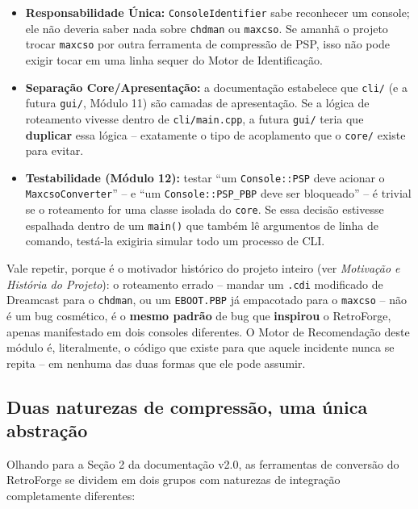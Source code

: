 \begin{itemize}
    \item \textbf{Responsabilidade Única:} \texttt{ConsoleIdentifier} sabe reconhecer um console;
ele não deveria saber nada sobre \texttt{chdman} ou \texttt{maxcso}. Se amanhã o projeto trocar \texttt{maxcso} por outra ferramenta de compressão de PSP, isso não pode exigir tocar em uma linha sequer do Motor de Identificação.
    \item \textbf{Separação Core/Apresentação:} a documentação estabelece que \texttt{cli/} (e a futura \texttt{gui/}, Módulo 11) são camadas de apresentação.
Se a lógica de roteamento vivesse dentro de \texttt{cli/main.cpp}, a futura \texttt{gui/} teria que \textbf{duplicar} essa lógica -- exatamente o tipo de acoplamento que o \texttt{core/} existe para evitar.
    \item \textbf{Testabilidade (Módulo 12):} testar ``um \texttt{Console::PSP} deve acionar o \texttt{MaxcsoConverter}'' -- e ``um \texttt{Console::PSP\_PBP} deve ser bloqueado'' -- é trivial se o roteamento for uma classe isolada do \texttt{core}.
Se essa decisão estivesse espalhada dentro de um \texttt{main()} que também lê argumentos de linha de comando, testá-la exigiria simular todo um processo de CLI.
\end{itemize}

\begin{CaixaAlerta}
Vale repetir, porque é o motivador histórico do projeto inteiro (ver \textit{Motivação e História do Projeto}): o roteamento errado -- mandar um \texttt{.cdi} modificado de Dreamcast para o \texttt{chdman}, ou um \texttt{EBOOT.PBP} já empacotado para o \texttt{maxcso} -- não é um bug cosmético, é o \textbf{mesmo padrão} de bug que \textbf{inspirou} o RetroForge, apenas manifestado em dois consoles diferentes.
O Motor de Recomendação deste módulo é, literalmente, o código que existe para que aquele incidente nunca se repita -- em nenhuma das duas formas que ele pode assumir.
\end{CaixaAlerta}

\subsection{Duas naturezas de compressão, uma única abstração}

Olhando para a Seção 2 da documentação v2.0, as ferramentas de conversão do RetroForge se dividem em dois grupos com naturezas de integração completamente diferentes:

